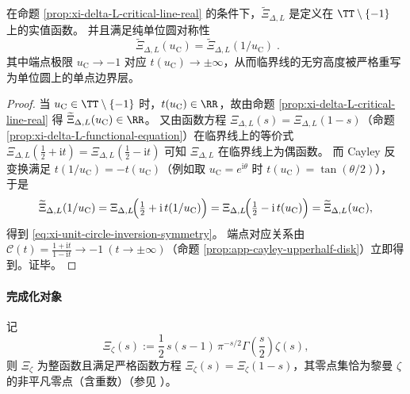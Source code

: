 \begin{proposition}\label{prop:xi-nonperiodic-phase-symmetry}
在命题 \ref{prop:xi-delta-L-critical-line-real} 的条件下，\(\widetilde{\Xi}_{\Delta,L}\) 是定义在 \(\TT\setminus\{-1\}\) 上的实值函数。
并且满足纯单位圆对称性
\begin{equation}\label{eq:xi-unit-circle-inversion-symmetry}
\boxed{\;
\widetilde{\Xi}_{\Delta,L}(u_{\mathrm C})
=\widetilde{\Xi}_{\Delta,L}(1/u_{\mathrm C})\; }.
\end{equation}
其中端点极限 \(u_{\mathrm C}\to-1\) 对应 \(t(u_{\mathrm C})\to\pm\infty\)，从而临界线的无穷高度被严格重写为单位圆上的单点边界层。
\end{proposition}
\begin{proof}
当 \(u_{\mathrm C}\in\TT\setminus\{-1\}\) 时，\(t(u_{\mathrm C})\in\RR\)，故由命题 \ref{prop:xi-delta-L-critical-line-real} 得 \(\widetilde{\Xi}_{\Delta,L}(u_{\mathrm C})\in\RR\)。
又由函数方程 \(\Xi_{\Delta,L}(s)=\Xi_{\Delta,L}(1-s)\)（命题 \ref{prop:xi-delta-L-functional-equation}）在临界线上的等价式
\(
\Xi_{\Delta,L}(\tfrac12+\mathrm{i}t)=\Xi_{\Delta,L}(\tfrac12-\mathrm{i}t)
\)
可知 \(\Xi_{\Delta,L}\) 在临界线上为偶函数。
而 Cayley 反变换满足 \(t(1/u_{\mathrm C})=-t(u_{\mathrm C})\)（例如取 \(u_{\mathrm C}=e^{\mathrm{i}\theta}\) 时 \(t(u_{\mathrm C})=\tan(\theta/2)\)），
于是
\[
\widetilde{\Xi}_{\Delta,L}(1/u_{\mathrm C})
=\Xi_{\Delta,L}\!\Bigl(\tfrac12+\mathrm{i}\,t(1/u_{\mathrm C})\Bigr)
=\Xi_{\Delta,L}\!\Bigl(\tfrac12-\mathrm{i}\,t(u_{\mathrm C})\Bigr)
=\widetilde{\Xi}_{\Delta,L}(u_{\mathrm C}),
\]
得到 \eqref{eq:xi-unit-circle-inversion-symmetry}。
端点对应关系由 \(\mathcal{C}(t)=\frac{1+\mathrm{i}t}{1-\mathrm{i}t}\to-1\ (t\to\pm\infty)\)（命题 \ref{prop:app-cayley-upperhalf-disk}）立即得到。证毕。
\end{proof}

\paragraph{完成化对象}
记
\begin{equation}\label{eq:app-xi-classical}
\Xi_{\zeta}(s):=\frac12\,s(s-1)\,\pi^{-s/2}\Gamma\!\left(\frac{s}{2}\right)\zeta(s),
\end{equation}
则 \(\Xi_{\zeta}\) 为整函数且满足严格函数方程 \(\Xi_{\zeta}(s)=\Xi_{\zeta}(1-s)\)，其零点集恰为黎曼 \(\zeta\) 的非平凡零点（含重数）（参见 \cite{Apostol1976}）。

